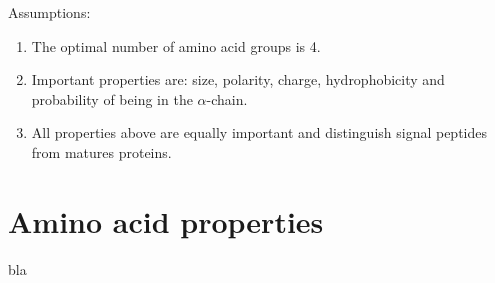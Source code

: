 \documentclass[10pt]{beamer}\usepackage[]{graphicx}\usepackage[]{color}
\begin{document}
\begin{frame}
Assumptions:
\begin{enumerate}
\item The optimal number of amino acid groups is 4.
\item Important properties are: size, polarity, charge, hydrophobicity and probability of being in the $\alpha$-chain. 
\item All properties above are equally important and distinguish signal peptides from matures proteins.
\end{enumerate}
\end{frame}



\section{Amino acid properties}

\begin{frame}
bla
\end{frame}
\end{document}
